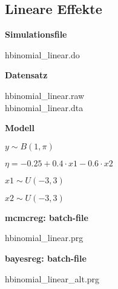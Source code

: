 \documentclass[10pt,a4paper]{article}
\begin{document}
\subsection{Lineare Effekte}

{\bf Simulationsfile}

hbinomial\_linear.do

{\bf Datensatz}

hbinomial\_linear.raw \\[0.2cm]
hbinomial\_linear.dta


{\bf Modell}


$y  \sim B(1,\pi)$

$\eta = -0.25+0.4 \cdot x1-0.6 \cdot x2$


$x1 \sim U(-3,3)$

$x2 \sim U(-3,3)$

{\bf mcmcreg: batch-file}

hbinomial\_linear.prg

{\bf bayesreg: batch-file}

hbinomial\_linear\_alt.prg
\end{document}
